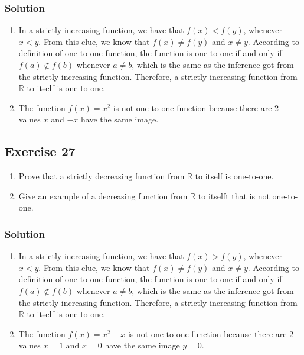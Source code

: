 \documentclass{article}
\theoremstyle{mytheoremstyle}
\theoremstyle{mytheoremstyle}
\theoremstyle{myproblemstyle}
\begin{document}
    \subsubsection*{Solution}
        \begin{enumerate} [label = (\alph*)]
            \item In a strictly increasing function, we have that \(f(x) < f(y)\), whenever \(x < y\). From this clue, we know that \(f(x) \neq f(y)\) and \(x \neq y\).
            According to definition of one-to-one function, the function is one-to-one if and only if \(f(a) \notin f(b)\) whenever \(a \neq b\), which is the same as the inference
            got from the strictly increasing function. Therefore, a strictly increasing function from \(\mathbb{R}\) to itself is one-to-one.
            \item The function \(f(x) = x^2\) is not one-to-one function because there are 2 values \(x\) and \(-x\) have the same image.
        \end{enumerate}
    \subsection*{Exercise 27}
        \begin{enumerate} [label = (\alph*)]
            \item Prove that a strictly decreasing function from \(\mathbb{R}\) to itself is one-to-one.
            \item Give an example of a decreasing function from \(\mathbb{R}\) to itselft that is not one-to-one.
        \end{enumerate}
    \subsubsection*{Solution}
        \begin{enumerate} [label = (\alph*)]
            \item In a strictly increasing function, we have that \(f(x) > f(y)\), whenever \(x < y\). From this clue, we know that \(f(x) \neq f(y)\) and \(x \neq y\).
            According to definition of one-to-one function, the function is one-to-one if and only if \(f(a) \notin f(b)\) whenever \(a \neq b\), which is the same as the inference
            got from the strictly increasing function. Therefore, a strictly increasing function from \(\mathbb{R}\) to itself is one-to-one.
            \item The function \(f(x) = x^2 - x\) is not one-to-one function because there are 2 values \(x = 1\) and \(x = 0\) have the same image \(y = 0\). 
        \end{enumerate}
\end{document}
